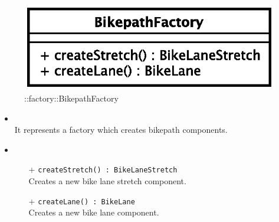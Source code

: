 \begin{figure}[h]
\centering
\includegraphics[scale=0.6,keepaspectratio]{images/solution/app/backend/bikepath_factory.eps}
\caption{\pReactiveFactory::factory::BikepathFactory}
\label{fig:sd-app-bikepath-factory}
\end{figure}
\FloatBarrier
\begin{itemize}
  \item \textbf{\descr} \\
It represents a factory which creates bikepath components.
  \item \textbf{\ops} \\
  \begin{itemize} 
    \item[+] \texttt{createStretch() : BikeLaneStretch} \\
Creates a new bike lane stretch component.
    \item[+] \texttt{createLane() : BikeLane} \\
Creates a new bike lane component.
  \end{itemize}
\end{itemize}
